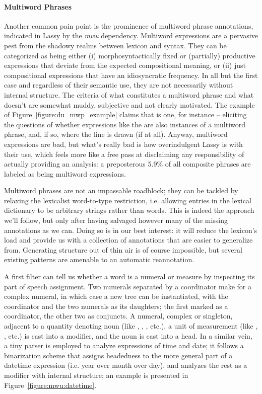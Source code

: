 \paragraph{Multiword Phrases}
Another common pain point is the prominence of multiword phrase annotations, indicated in Lassy by the \textit{mwu} dependency.
Multiword expressions are a pervasive pest from the shadowy realms between lexicon and syntax.
They can be categorized as being either (i) morphosyntactically fixed or (partially) productive expressions that deviate from the expected compositional meaning, or (ii) just compositional expressions that have an idiosyncratic frequency.
In all but the first case and regardless of their semantic use, they are not necessarily without internal structure.
The criteria of what constitutes a multiword phrase and what doesn't are somewhat muddy, subjective and not clearly motivated.
The example of Figure~\ref{figure:du_mwp_example} claims that  is one, for instance -- eliciting the questions of whether expressions like the  are also instances of a multiword phrase, and, if so, where the line is drawn (if at all).
Anyway, multiword expressions are bad, but what's really bad is how overindulgent Lassy is with their use, which feels more like a free pass at disclaiming any responsibility of actually providing an analysis: a preposterous 5.9\% of all composite phrases are labeled as being multiword expressions.

Multiword phrases are not an impassable roadblock; they can be tackled by relaxing the lexicalist word-to-type restriction, i.e. allowing entries in the lexical dictionary to be arbitrary strings rather than words.
This is indeed the approach we'll follow, but only after having salvaged however many of the missing annotations as we can.
Doing so is in our best interest: it will reduce the lexicon's load and provide us with a collection of annotations that are easier to generalize from.
Generating structure out of thin air is of course impossible, but several existing patterns are amenable to an automatic reannotation.

A first filter can tell us whether a word is a numeral or measure by inspecting its part of speech assignment.
Two numerals separated by a coordinator make for a complex numeral, in which case a new tree can be instantiated, with the coordinator and the two numerals as its daughters; the first marked as a coordinator, the other two as conjuncts.
A numeral, complex or singleton, adjacent to a quantity denoting noun (like , , , etc.), a unit of measurement (like , , etc.) is cast into a modifier, and the noun is cast into a head.
In a similar vein, a tiny parser is employed to analyze expressions of time and date; it follows a binarization scheme that assigns headedness to the more general part of a datetime expression (i.e. year over month over day), and analyzes the rest as a modifier with internal structure; an example is presented in Figure~\ref{figure:mwu:datetime}.

